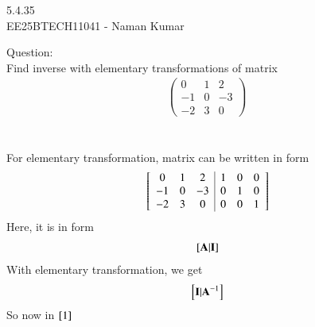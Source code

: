 \documentclass[journal]{IEEEtran}
\author{EE25BTECH11041-Naman Kumar }
\begin{document}
\begin{center}
    \huge{5.4.35}\\
    \large{EE25BTECH11041 - Naman Kumar}
\end{center}
Question:\\
Find inverse with elementary transformations of matrix
\begin{align}
\begin{pmatrix}0&1&2\\-1&0&-3\\-2&3&0\end{pmatrix}
\end{align} \\
\solution \\
For elementary transformation, matrix can be written in form
\begin{align}
    {}\left[\begin{array}{ccc|ccc}
        0  & 1 & 2 & 1 & 0 & 0\\
        -1 & 0 &-3 & 0 & 1 & 0\\
        -2 & 3 & 0 & 0 & 0 & 1
    \end{array}\right] \label{1}
\end{align}
Here, it is in form
\begin{align}
    {}\left[\mathbf{A}\vert \mathbf{I}\right]
\end{align}
With elementary transformation, we get
\begin{align}
    {}\left[\mathbf{I}\vert \mathbf{A}^{-1}\right]
\end{align}
So now in $\eqref{1}$
\end{document}
